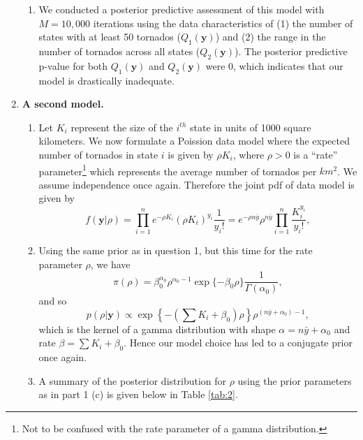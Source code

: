 \documentclass[12pt]{article}
\begin{document}
\begin{enumerate}[leftmargin=*]
\begin{enumerate}[leftmargin=1mm]
      \item We conducted a posterior predictive assessment of this model with $M = 10,000$ iterations 
        using the data characteristics of (1) the number of states with at least 50
        tornados ($Q_1(\bm{y})$) and (2) the range in the number of tornados across all states ($Q_2(\bm{y})$). The posterior predictive p-value for
        both $Q_1(\bm{y})$ and $Q_2(\bm{y})$ were 0, which indicates that our model is drastically inadequate.

    \end{enumerate}

    \newpage
  \item \textbf{A second model.}
    \begin{enumerate}[leftmargin=1mm]
      \item Let $K_i$ represent the size of the $i^{th}$ state in units of 1000 square kilometers. We now formulate a Poission data model where the 
        expected number of tornados in state $i$ is given by $\rho K_i$, where $\rho > 0$ is a ``rate'' parameter\footnote{Not to be confused with the
        rate parameter of a gamma distribution.} which represents the average number of tornados per $km^2$.
        We assume independence once again.
        Therefore the joint pdf of data model is given by 
        \[
          f(\bm{y}|\rho) = \prod_{i=1}^{n} e^{-\rho K_i}(\rho K_i)^{y_i} \frac{1}{y_i!} = e^{-\rho n\bar{y}}\rho^{n\bar{y}}
          \prod_{i=1}^{n}\frac{K_i^{y_i}}{y_i!},
        \]

      \item Using the same prior as in question 1, but this time for the rate parameter $\rho$, we have 
        \[
          \pi(\rho) = \beta_0^{\alpha_0}\rho^{\alpha_0 - 1}\exp\{-\beta_0\rho\} \frac{1}{\Gamma(\alpha_0)},
        \]
        and so
        \[
          p(\rho|\bm{y}) \propto \exp\left\{-\left(\sum K_i + \beta_0\right)\rho\right\} \rho^{(n\bar{y} + \alpha_0) - 1},
        \]
        which is the kernel of a gamma distribution with shape $\alpha = n\bar{y} + \alpha_0$ and rate $\beta = \sum K_i + \beta_0$.
        Hence our model choice has led to a conjugate prior once again.

      \item A summary of the posterior distribution for $\rho$ using the prior parameters as in part 1 (c) is given below in Table \ref{tab:2}.


\end{enumerate}
\end{enumerate}
\end{document}
